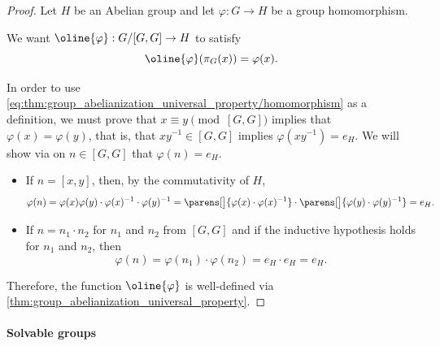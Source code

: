 \begin{proof}
  Let \( H \) be an Abelian group and let \( \varphi: G \to H \) be a group homomorphism.

  We want \( \oline{\varphi}: G / [G, G] \to H \) to satisfy
  \begin{equation}\label{eq:thm:group_abelianization_universal_property/homomorphism}
    \oline{\varphi}(\pi_G(x)) = \varphi(x).
  \end{equation}

  In order to use \eqref{eq:thm:group_abelianization_universal_property/homomorphism} as a definition, we must prove that \( x \equiv y \pmod {[G, G]} \) implies that \( \varphi(x) = \varphi(y) \), that is, that \( xy^{-1} \in [G, G] \) implies \( \varphi(xy^{-1}) = e_H \). We will show via  on \( n \in [G, G] \) that \( \varphi(n) = e_H \).
  \begin{itemize}
    \item If \( n = [x, y] \), then, by the commutativity of \( H \),
    \begin{equation*}
      \varphi(n)
      =
      \varphi(x) \varphi(y) \cdot \varphi(x)^{-1} \cdot \varphi(y)^{-1}
      =
      \parens[\big]{ \varphi(x) \cdot \varphi(x)^{-1} } \cdot \parens[\big]{ \varphi(y) \cdot \varphi(y)^{-1} }
      =
      e_H.
    \end{equation*}

    \item If \( n = n_1 \cdot n_2 \) for \( n_1 \) and \( n_2 \) from \( [G, G] \) and if the inductive hypothesis holds for \( n_1 \) and \( n_2 \), then
    \begin{equation*}
      \varphi(n)
      =
      \varphi(n_1) \cdot \varphi(n_2)
      =
      e_H \cdot e_H
      =
      e_H.
    \end{equation*}
  \end{itemize}

  Therefore, the function \( \oline{\varphi} \) is well-defined via \eqref{thm:group_abelianization_universal_property}.
\end{proof}

\paragraph{Solvable groups}

